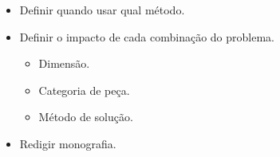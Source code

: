 
\begin{itemize}
    \item Definir quando usar qual método.
    \item Definir o impacto de cada combinação do problema.
    \begin{itemize}
        \item Dimensão.
        \item Categoria de peça.
        \item Método de solução.
    \end{itemize}
    \item Redigir monografia.
\end{itemize}